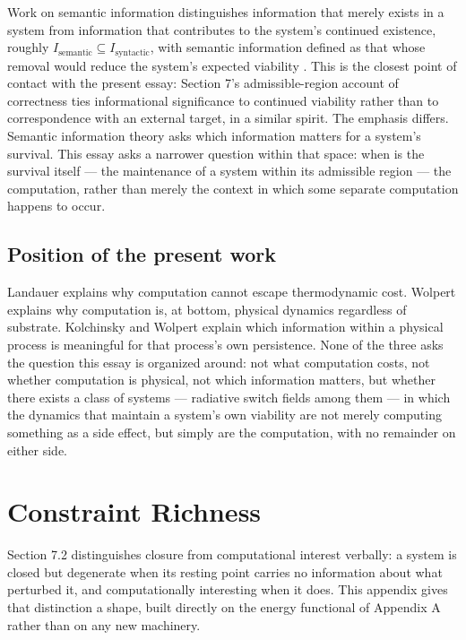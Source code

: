 \documentclass[11pt]{article}
\begin{document}
Work on semantic information distinguishes information that merely exists in a system from information that contributes to the system's continued existence, roughly $I_{\text{semantic}} \subseteq I_{\text{syntactic}}$, with semantic information defined as that whose removal would reduce the system's expected viability \cite{kolchinsky2018}. This is the closest point of contact with the present essay: Section 7's admissible-region account of correctness ties informational significance to continued viability rather than to correspondence with an external target, in a similar spirit. The emphasis differs. Semantic information theory asks which information matters for a system's survival. This essay asks a narrower question within that space: when is the survival itself --- the maintenance of a system within its admissible region --- the computation, rather than merely the context in which some separate computation happens to occur.

\subsection{Position of the present work}

Landauer explains why computation cannot escape thermodynamic cost. Wolpert explains why computation is, at bottom, physical dynamics regardless of substrate. Kolchinsky and Wolpert explain which information within a physical process is meaningful for that process's own persistence. None of the three asks the question this essay is organized around: not what computation costs, not whether computation is physical, not which information matters, but whether there exists a class of systems --- radiative switch fields among them --- in which the dynamics that maintain a system's own viability are not merely computing something as a side effect, but simply are the computation, with no remainder on either side.

\section{Constraint Richness}

Section 7.2 distinguishes closure from computational interest verbally: a system is closed but degenerate when its resting point carries no information about what perturbed it, and computationally interesting when it does. This appendix gives that distinction a shape, built directly on the energy functional of Appendix A rather than on any new machinery.
\end{document}
